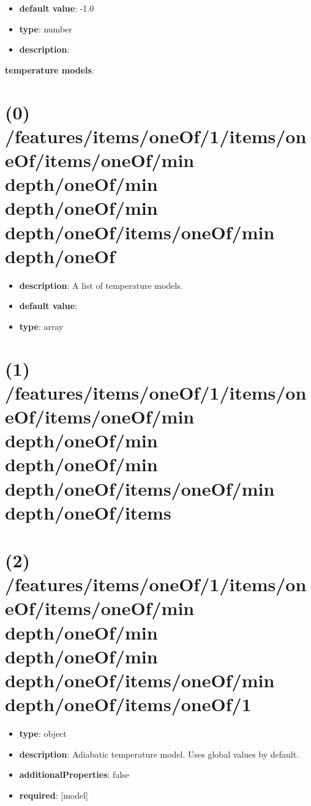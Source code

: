 \begin{itemize}[leftmargin=4em]\item {\bf default value}: -1.0
\item {\bf type}: number
\item {\bf description}: 
\end{itemize}\item {\bf temperature models}: \section{(0) /features/items/oneOf/1/items/oneOf/items/oneOf/min depth/oneOf/min depth/oneOf/min depth/oneOf/items/oneOf/min depth/oneOf}
\begin{itemize}[leftmargin=0em]\item {\bf description}: A list of temperature models.
\item {\bf default value}: 
\item {\bf type}: array
\end{itemize}\section{(1) /features/items/oneOf/1/items/oneOf/items/oneOf/min depth/oneOf/min depth/oneOf/min depth/oneOf/items/oneOf/min depth/oneOf/items}

\section{(2) /features/items/oneOf/1/items/oneOf/items/oneOf/min depth/oneOf/min depth/oneOf/min depth/oneOf/items/oneOf/min depth/oneOf/items/oneOf/1}
\begin{itemize}[leftmargin=2em]\item {\bf type}: object
\item {\bf description}: Adiabatic temperature model. Uses global values by default.
\item {\bf additionalProperties}: false
\item {\bf required}: [model]\end{itemize}
